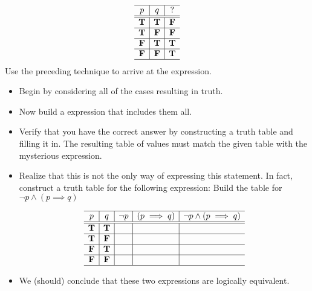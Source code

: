\newpage
\begin{problem}
\[  \begin{array}{c|c|c}
  \hline  
  p & q 	& ? \\
  \hline
  \hline
 \mathbf{T} &  \mathbf{T} 	&  \mathbf{F}\\
  \hline
 \mathbf{T} &  \mathbf{F} 	&  \mathbf{F}\\
  \hline
 \mathbf{F} &  \mathbf{T} 	&  \mathbf{T}\\
  \hline
 \mathbf{F} &  \mathbf{F}  	&  \mathbf{T}\\
    \hline
    \end{array}\]
Use the preceding technique to arrive at the expression.

\begin{itemize}
\item Begin by considering all of the cases resulting in truth.


\item Now build a expression that includes them all.


\item Verify that you have the correct answer by constructing a truth table and filling it in.  The resulting table of values must match the given table with the mysterious expression.


\item Realize that this is not the only way of expressing this statement.  In fact, construct a truth table for the following expression:
  Build the table for $\neg p \land(p \implies q)$

 $$\begin{array}{c|c|c|c|c}
  \hline  
  p & q &\neg p &(p\implies q)		& \neg p \land (p\implies q)\\
  \hline
  \hline
 \mathbf{T} &  \mathbf{T} 	& 	& 	& \\
  \hline
 \mathbf{T} &  \mathbf{F} 	&  	&	& \\
  \hline
 \mathbf{F} &  \mathbf{T} 	&	& 	&  \\
   \hline
 \mathbf{F} &  \mathbf{F} 	&	&	&  \\
    \hline
    \end{array}$$
    
\item We (should) conclude that these two expressions are logically equivalent.  
\end{itemize}



\end{problem}
